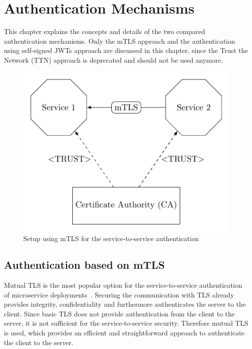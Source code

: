 \chapter{Authentication Mechanisms}
\label{cha:authentication_mechanisms}
This chapter explains the concepts and details of the two compared authentication mechanisms.
Only the mTLS approach and the authentication using self-signed JWTs approach are discussed in this chapter, since the Trust the Network (TTN) approach is deprecated and should not be used anymore.

\begin{figure}
	\centering
	\includegraphics{images/authentication-mechanisms/TikZ_mTLS_base_structure.pdf}
	\caption{Setup using mTLS for the service-to-service authentication~\cite{dias2020microservices}}
	\label{fig:auth_mechanisms_mtls}
\end{figure}

\section{Authentication based on mTLS}
Mutual TLS is the most popular option for the service-to-service authentication of microservice deployments~\cite{dias2020microservices}.
Securing the communication with TLS already provides integrity, confidentiality and furthermore authenticates the server to the client.
Since basic TLS does not provide authentication from the client to the server, it is not sufficient for the service-to-service security.
Therefore mutual TLS is used, which provides an efficient and straightforward approach to authenticate the client to the server.

